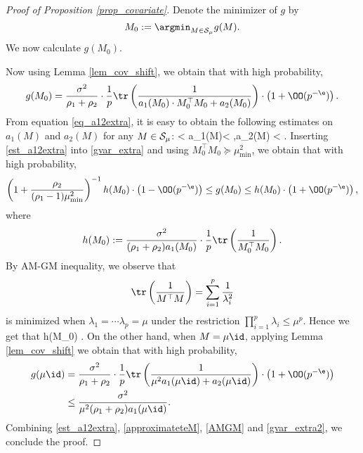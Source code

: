 \begin{proof}[Proof of Proposition \ref{prop_covariate}]



 Denote the minimizer of $g$ by
$$M_0:=\argmin_{M\in \cal S_{\mu}}g(M).$$
We now calculate $g(M_0)$.


Now using Lemma \ref{lem_cov_shift}, we obtain that with high probability,
\begin{align}\label{gvar_extra}
g(M_0)= \frac{\sigma^2}{\rho_1+\rho_2}\cdot \frac1p\tr\left( \frac{1}{a_1(M_0)\cdot M_0^\top M_0 + a_2(M_0)}\right) \cdot \left(1 +\OO(p^{-\e})\right).
\end{align}
From equation \eqref{eq_a12extra}, it is easy to obtain the following estimates on $ a_1(M)$ and $a_2(M)$ for any $M\in \cal S_\mu$:
\be\label{est_a12extra}
 < a_1(M)<  ,\quad a_2(M) < .
\ee
Inserting \eqref{est_a12extra} into \eqref{gvar_extra} and using $ M_0^\top M_0\succeq \mu_{\min}^2$, we obtain that with high probability,
\begin{align}\label{approximateteM}
\left(1+\frac{\rho_2}{(\rho_1-1)\mu_{\min}^2}\right)^{-1}h(M_0) \cdot \left(1 - \OO(p^{-\e})\right) \le g(M_0) \le h(M_0) \cdot \left(1 +\OO(p^{-\e})\right),
\end{align}
where
$$h(M_0):=\frac{\sigma^2}{(\rho_1+\rho_2)a_1(M_0)}\cdot \frac1p\tr\left( \frac{1}{M_0^\top M_0}\right) .$$
%
By AM-GM inequality, we observe that
$$\tr\left( \frac{1}{M^\top M}\right) = \sum_{i=1}^p\frac{1}{\lambda_i^2}$$
is minimized when $\lambda_1 = \cdots\lambda_p=\mu$ under the restriction $\prod_{i=1}^p\lambda_i\le \mu^p$. Hence we get that
\be\label{AMGM} h(M_0) \le {}.\ee
On the other hand, when $M=\mu \id$, applying Lemma \ref{lem_cov_shift} we obtain that with high probability,
\begin{align}\label{gvar_extra2}
\begin{split}
g(\mu \id)&= \frac{\sigma^2}{\rho_1+\rho_2}\cdot \frac1p\tr\left( \frac{1}{\mu^2 a_1 (\mu\id) + a_2(\mu\id)}\right) \cdot \left(1 +\OO(p^{-\e})\right)\\
&\le \frac{\sigma^2}{\mu^2(\rho_1+\rho_2)a_1 (\mu\id)}.
\end{split}
\end{align}
Combining \eqref{est_a12extra}, \eqref{approximateteM}, \eqref{AMGM} and \eqref{gvar_extra2}, we conclude the proof.
\end{proof}
\fi

